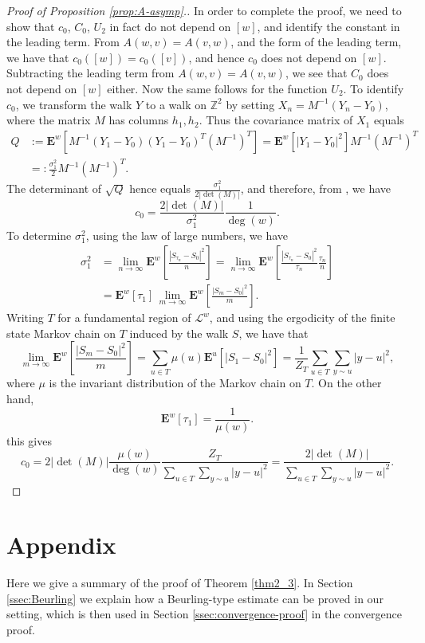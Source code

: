 \documentclass[11pt]{article}
\theoremstyle{remark}
\def\E{\mathbf{E}}
\def\cL{\mathcal{L}}
\newcommand{\eqnsplst}[1]{\begin{equation*}\begin{split}%
   #1\end{split}\end{equation*}}
\begin{document}
\begin{proof}[Proof of Proposition \ref{prop:A-asymp}.]
In order to complete the proof, we need to show that $c_0$, $C_0$, $U_2$ in fact do not depend 
on $[w]$, and identify the constant in the leading term. From $A(w,v) = A(v,w)$, and the
form of the leading term, we have that $c_0([w]) = c_0([v])$, and hence $c_0$ does not depend
on $[w]$. Subtracting the leading term from $A(w,v) = A(v,w)$, we see that $C_0$ does not
depend on $[w]$ either. Now the same follows for the function $U_2$. To identify $c_0$, 
we transform the walk $Y$ to a walk on $\mathbb{Z}^2$ by setting 
$X_n = M^{-1} (Y_n - Y_0)$, where the matrix $M$ has columns $h_1, h_2$. Thus the 
covariance matrix of $X_1$ equals
\eqnsplst{ 
   Q
   &:= \E^w [ M^{-1} (Y_1-Y_0) (Y_1 - Y_0)^T (M^{-1})^T ] 
   = \E^w [ |Y_1 - Y_0|^2 ] M^{-1} (M^{-1})^T \\
   &=: \frac{\sigma_1^2}{2} M^{-1} (M^{-1})^T. }
The determinant of $\sqrt{Q}$ hence equals $\frac{\sigma_1^2}{2 |\det(M)|}$, and 
therefore, from \cite[Theorem 1]{FU96}, we have
\[ c_0
   = \frac{2 |\det(M)|}{\sigma_1^2} \frac{1}{\deg(w)}. \]
To determine $\sigma_1^2$, using the law of large numbers, we have
\eqnsplst{ 
   \sigma_1^2
   &= \lim_{n \to \infty} \E^w \left[ \frac{|S_{\tau_n} - S_0|^2}{n} \right]
   = \lim_{n \to \infty} 
     \E^w \left[ \frac{|S_{\tau_n} - S_0|^2}{\tau_n} \frac{\tau_n}{n} \right] \\
   &= \E^w [ \tau_1 ] \, \lim_{m \to \infty} \E^w \left[ \frac{|S_m - S_0|^2}{m} \right]. }
Writing $T$ for a fundamental region of $\cL^w$, and using the ergodicity of the 
finite state Markov chain on $T$ induced by the walk $S$, we have that 
\[ \lim_{m \to \infty} \E^w \left[ \frac{|S_m - S_0|^2}{m} \right]
   = \sum_{u \in T} \mu(u) \E^u [ |S_1 - S_0|^2 ]
   = \frac{1}{Z_T} \sum_{u \in T} \sum_{y \sim u} |y-u|^2, \]
where $\mu$ is the invariant distribution of the Markov chain on $T$. On the other hand,
\[ \E^w [ \tau_1 ]
   = \frac{1}{\mu(w)}. \]
this gives
\[ c_0
   = 2 |\det(M)| \frac{\mu(w)}{\deg(w)} 
    \frac{Z_T}{\sum_{u \in T} \sum_{y \sim u} |y - u|^2}
   = \frac{2 |\det(M)|}{\sum_{u \in T} \sum_{y \sim u} |y - u|^2}. \]
\end{proof}

\section{Appendix}
\label{sec:proof-harmonic-conv}

Here we give a summary of the proof of Theorem \ref{thm2_3}. In Section \ref{ssec:Beurling}
we explain how a Beurling-type estimate can be proved in our setting, which is then used 
in Section \ref{ssec:convergence-proof} in the convergence proof.
\end{document}
